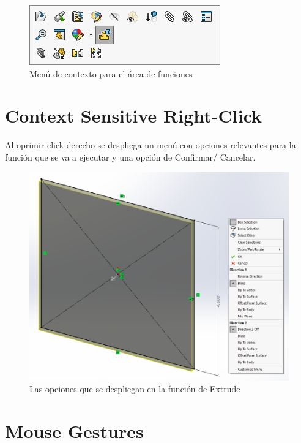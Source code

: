 \documentclass[12pt,letterpaper,final]{report}
\begin{document}
\begin{figure}[H]
	\centering
	\includegraphics[width=0.75\linewidth, height=0.5\textheight,keepaspectratio]{Imagenes/solidworks_contextmenu_04}
	\caption{Menú de contexto para el área de funciones}
	\label{fig:solidworkscontextmenu04}
\end{figure}

\chapter{Context Sensitive Right-Click}

Al oprimir click-derecho se despliega un menú con opciones relevantes para la función que se va a ejecutar y una opción de Confirmar/ Cancelar.

\begin{figure}[H]
	\centering
	\includegraphics[width=0.85\linewidth, height=0.5\textheight,keepaspectratio]{Imagenes/solidworks_contextrightclick01}
	\caption{Las opciones que se despliegan en la función de Extrude}
	\label{fig:solidworkscontextrightclick01}
\end{figure}


\chapter{Mouse Gestures}
\end{document}
